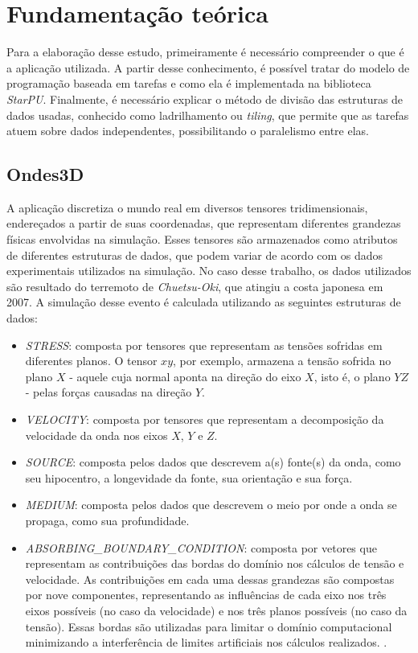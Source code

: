 \documentclass[cic,tc]{iiufrgs}
\begin{document}
\chapter{Fundamentação teórica}
Para a elaboração desse estudo, primeiramente é necessário compreender o que é a aplicação utilizada. A partir desse conhecimento, é possível tratar do modelo de programação
baseada em tarefas e como ela é implementada na biblioteca \textit{StarPU}. Finalmente, é necessário explicar o método de divisão das estruturas de dados usadas, conhecido como
ladrilhamento ou \textit{tiling}, que permite que as tarefas atuem sobre dados independentes, possibilitando o paralelismo entre elas.

\section{Ondes3D}
A aplicação discretiza o mundo real em diversos tensores tridimensionais, endereçados a partir de suas coordenadas, que representam diferentes grandezas físicas envolvidas
na simulação. Esses tensores são armazenados como atributos de diferentes estruturas de dados, que podem variar de acordo com os dados experimentais utilizados na simulação. No caso
desse trabalho, os dados utilizados são resultado do terremoto de \textit{Chuetsu-Oki}, que atingiu a costa japonesa em 2007. A simulação desse evento é calculada utilizando as
seguintes estruturas de dados:

\begin{itemize}
\item{\textit{STRESS}:} composta por tensores que representam as tensões sofridas em diferentes planos. O tensor $xy$, por exemplo, armazena a tensão sofrida no plano
  $X$ - aquele cuja normal aponta na direção do eixo $X$, isto é, o plano $YZ$ - pelas forças causadas na direção $Y$.
\item{\textit{VELOCITY}:} composta por tensores que representam a decomposição da velocidade da onda nos eixos $X$, $Y$ e $Z$.
\item{\textit{SOURCE}:} composta pelos dados que descrevem a(s) fonte(s) da onda, como seu hipocentro, a longevidade da fonte, sua orientação e sua força.
\item{\textit{MEDIUM}:} composta pelos dados que descrevem o meio por onde a onda se propaga, como sua profundidade.
\item{\textit{ABSORBING\_BOUNDARY\_CONDITION}:} composta por vetores que representam as contribuições das bordas do domínio nos cálculos
  de tensão e velocidade. As contribuições em cada uma dessas grandezas são compostas por nove componentes, representando as influências de
  cada eixo nos três eixos possíveis (no caso da velocidade) e nos três planos possíveis (no caso da tensão). Essas bordas são utilizadas
  para limitar o domínio computacional minimizando a interferência de limites artificiais nos cálculos realizados. \cite{ABCarticle}. 
\end{itemize}
\end{document}
